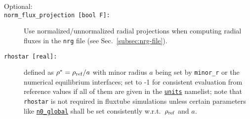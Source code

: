 \documentclass[12pt]{article}
\begin{document}
\begin{description}
\item[Optional:]

\item[\hypertarget{norm_flux_projection}{\tt norm\_flux\_projection [bool F]:}] Use normalized/unnormalized radial projections
when computing radial fluxes in the {\tt nrg} file (see Sec.~\ref{subsec:nrg-file}).

\item[\hypertarget{rhostar}{\tt rhostar [real]:}] defined as $\rho^* = \rho_{\rm ref}/a$ with minor radius $a$ being set by {\tt minor\_r}
or the numerical equilibrium interfaces; set to -1 for consistent evaluation from reference values if all of them are given
in the \hyperlink{units_nml}{\tt units} namelist; note that {\tt rhostar} is not required in fluxtube simulations unless certain
parameters like \hyperlink{n0_global}{\tt n0\_global} shall be set consistently w.r.t.~$\rho_{\rm ref}$ and $a$.\\

\end{description}
\end{document}
